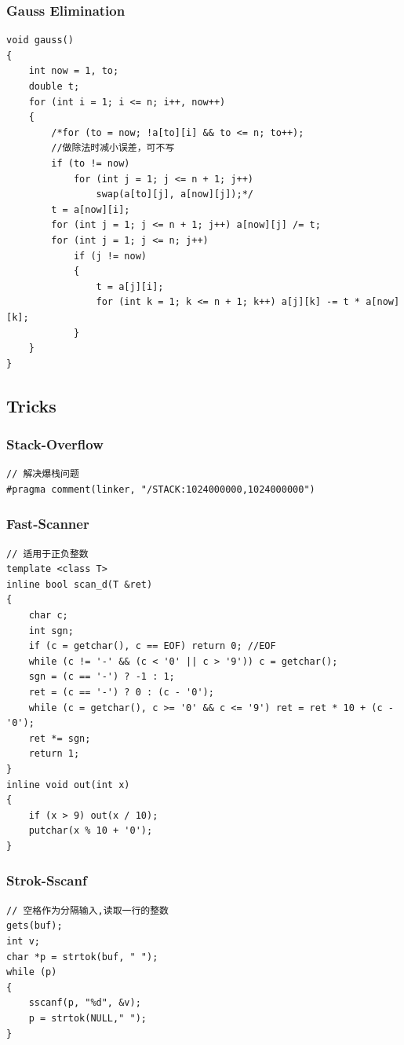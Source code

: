 \documentclass[twoside]{article}
\begin{document}
\subsubsection{Gauss Elimination}
\begin{lstlisting}
void gauss()
{
    int now = 1, to;
    double t;
    for (int i = 1; i <= n; i++, now++)
    {
        /*for (to = now; !a[to][i] && to <= n; to++);
        //做除法时减小误差，可不写
        if (to != now)
            for (int j = 1; j <= n + 1; j++)
                swap(a[to][j], a[now][j]);*/
        t = a[now][i];
        for (int j = 1; j <= n + 1; j++) a[now][j] /= t;
        for (int j = 1; j <= n; j++)
            if (j != now)
            {
                t = a[j][i];
                for (int k = 1; k <= n + 1; k++) a[j][k] -= t * a[now][k];
            }
    }
}
\end{lstlisting}
\subsection{Tricks}
\subsubsection{Stack-Overflow}
\begin{lstlisting}
// 解决爆栈问题
#pragma comment(linker, "/STACK:1024000000,1024000000")
\end{lstlisting}
\subsubsection{Fast-Scanner}
\begin{lstlisting}
// 适用于正负整数
template <class T>
inline bool scan_d(T &ret)
{
    char c;
    int sgn;
    if (c = getchar(), c == EOF) return 0; //EOF
    while (c != '-' && (c < '0' || c > '9')) c = getchar();
    sgn = (c == '-') ? -1 : 1;
    ret = (c == '-') ? 0 : (c - '0');
    while (c = getchar(), c >= '0' && c <= '9') ret = ret * 10 + (c - '0');
    ret *= sgn;
    return 1;
}
inline void out(int x)
{
    if (x > 9) out(x / 10);
    putchar(x % 10 + '0');
}
\end{lstlisting}
\subsubsection{Strok-Sscanf}
\begin{lstlisting}
// 空格作为分隔输入,读取一行的整数
gets(buf);
int v;
char *p = strtok(buf, " ");
while (p)
{
    sscanf(p, "%d", &v);
    p = strtok(NULL," ");
}
\end{lstlisting}
\end{document}
